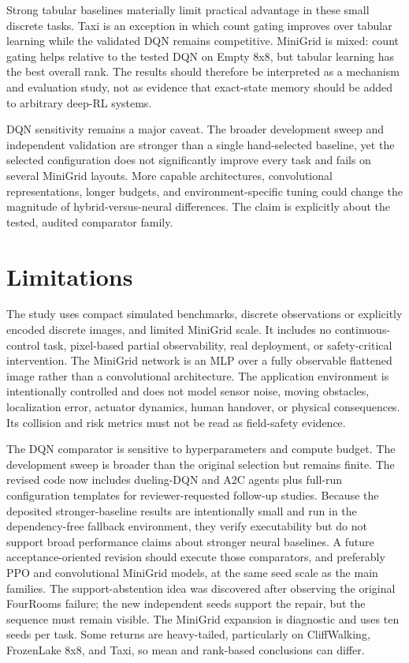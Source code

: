 \documentclass[preprint,12pt]{elsarticle}
\begin{document}
Strong tabular baselines materially limit practical advantage in these small
discrete tasks. Taxi is an exception in which count gating improves over
tabular learning while the validated DQN remains competitive. MiniGrid is
mixed: count gating helps relative to the tested DQN on Empty 8x8, but tabular
learning has the best overall rank. The results should therefore be interpreted
as a mechanism and evaluation study, not as evidence that exact-state memory
should be added to arbitrary deep-RL systems.

DQN sensitivity remains a major caveat. The broader development sweep and
independent validation are stronger than a single hand-selected baseline, yet
the selected configuration does not significantly improve every task and
fails on several MiniGrid layouts. More capable architectures, convolutional
representations, longer budgets, and environment-specific tuning could change
the magnitude of hybrid-versus-neural differences. The claim is explicitly
about the tested, audited comparator family.

\section{Limitations}
\label{sec:limitations}

The study uses compact simulated benchmarks, discrete observations or
explicitly encoded discrete images, and limited MiniGrid scale. It includes no
continuous-control task, pixel-based partial observability, real deployment,
or safety-critical intervention. The MiniGrid network is an MLP over a fully
observable flattened image rather than a convolutional architecture.
The application environment is intentionally controlled and does not model
sensor noise, moving obstacles, localization error, actuator dynamics, human
handover, or physical consequences. Its collision and risk metrics must not be
read as field-safety evidence.

The DQN comparator is sensitive to hyperparameters and compute budget. The
development sweep is broader than the original selection but remains finite.
The revised code now includes dueling-DQN and A2C agents plus full-run
configuration templates for reviewer-requested follow-up studies. Because the
deposited stronger-baseline results are intentionally small and run in the
dependency-free fallback environment, they verify executability but do not
support broad performance claims about stronger neural baselines. A future
acceptance-oriented revision should execute those comparators, and preferably
PPO and convolutional MiniGrid models, at the same seed scale as the main
families.
The support-abstention idea was discovered after observing the original
FourRooms failure; the new independent seeds support the repair, but the
sequence must remain visible. The MiniGrid expansion is diagnostic and uses
ten seeds per task. Some returns are heavy-tailed, particularly on
CliffWalking, FrozenLake 8x8, and Taxi, so mean and rank-based conclusions can
differ.
\end{document}
